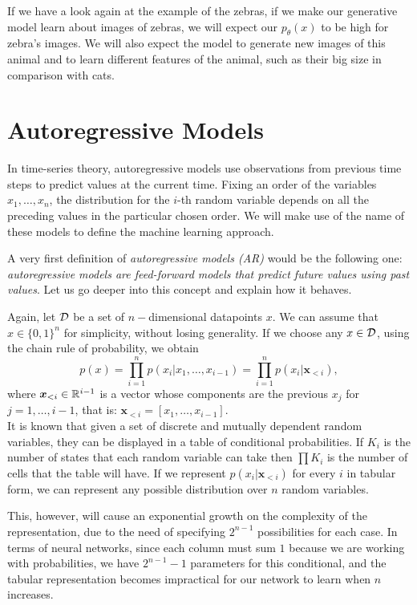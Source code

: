 If we have a look again at the example of the zebras, if we make our generative model learn about images of zebras, we will expect our $p_\theta(x)$ to be high for zebra's images. We will also expect the model
to generate new images of this animal and to learn different features of the animal, such as their big size in comparison with cats.

\section{Autoregressive Models}

In time-series theory, autoregressive models use observations from previous time steps to predict values at the current time. 
Fixing an order of the variables $x_1,\dots,x_n$, the distribution for the $i$-th random variable depends on all the preceding values in the particular chosen order. We will make use of the name of these models to 
define the machine learning approach.

A very first definition of \emph{autoregressive models (AR)} would be the following one: \emph{autoregressive models are feed-forward models that predict future values using past values}. Let us go deeper into this 
concept and explain how it behaves.

Again, let $\mathcal{D}$ be a set of $n-$dimensional datapoints $x$. We can assume that $x \in \{0,1\}^n$ for simplicity, without losing generality. If we choose any $x\in \mathcal{D}$, using the chain rule of probability, we obtain
\[
p(x) = \prod_{i=1} ^n p(x_i | x_1,\dots,x_{i-1}) = \prod_{i = 1}^n p(x_i|\bm{x}_{<i}),
\]
where $\bm{x}_{<i} \in \mathbb{R}^{i-1}$ is a vector whose components are the previous $x_j$ for $j = 1,\dots, i-1$, that is: $\bm{x}_{<i}= [x_1,\dots, x_{i-1}]$. \\
It is known that given a set of discrete and mutually dependent random variables, they can be displayed in a table of conditional probabilities. If $K_i$ is the number of states that each random variable can take
then $\prod K_i$ is the number of cells that the table will have. If we represent $p(x_i|\bm{x}_{<i})$ for every $i$ in tabular form, we can represent
any possible distribution over $n$ random variables. 

This, however, will cause an exponential growth on the complexity of the representation, due to the need of specifying $2^{n-1}$ possibilities 
for each case. In terms of neural networks, since each column must sum $1$ because we are working with probabilities, we have $2^{n-1}-1$ parameters for this conditional, and the tabular representation
becomes impractical for our network to learn when $n$ increases.

